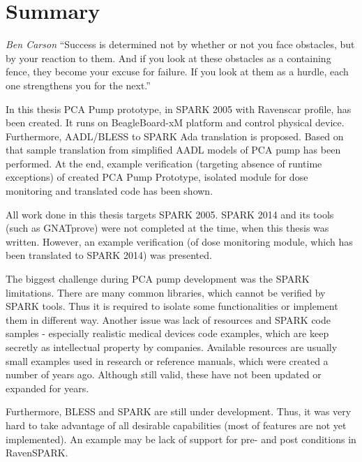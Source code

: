 
\cleardoublepage

\chapter{Summary}
\label{summary}

\begin{chapquote}{\textit{Ben Carson}}
``Success is determined not by whether or not you face obstacles, but by your reaction to them. And if you look at these obstacles as a containing fence, they become your excuse for failure. If you look at them as a hurdle, each one strengthens you for the next.''
\end{chapquote}

In this thesis PCA Pump prototype, in SPARK 2005 with Ravenscar profile, has been created. It runs on BeagleBoard-xM platform and control physical device. Furthermore, AADL/BLESS to SPARK Ada translation is proposed. Based on that sample translation from simplified AADL models of PCA pump has been performed. At the end, example verification (targeting absence of runtime exceptions) of created PCA Pump Prototype, isolated module for dose monitoring and translated code has been shown. 

All work done in this thesis targets SPARK 2005. SPARK 2014 and its tools (such as GNATprove) were not completed at the time, when this thesis was written. However, an example verification (of dose monitoring module, which has been translated to SPARK 2014) was presented.

The biggest challenge during PCA pump development was the SPARK limitations. There are many common libraries, which cannot be verified by SPARK tools. Thus it is required to isolate some functionalities or implement them in different way. Another issue was lack of resources and SPARK code samples - especially realistic medical devices code examples, which are keep secretly as intellectual property by companies. Available resources are usually small examples used in research or reference manuals, which were created a number of years ago. Although still valid, these have not been updated or expanded for years.

Furthermore, BLESS and SPARK are still under development. Thus, it was very hard to take advantage of all desirable capabilities (most of features are not yet implemented). An example may be lack of support for pre- and post conditions in RavenSPARK.

